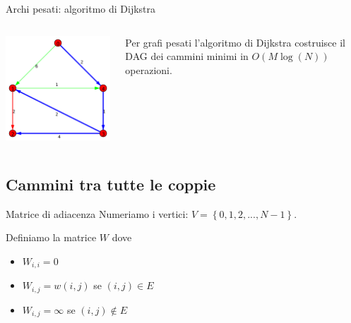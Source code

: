 \documentclass{beamer}
\theoremstyle{plain}
\theoremstyle{definition}
\theoremstyle{remark}
\newcommand{\set}[1]{\left\{#1\right\}}
\newcommand{\pa}[1]{\left(#1\right)}
\begin{document}
\begin{frame}{Archi pesati: algoritmo di Dijkstra}
    \begin{columns}
    \begin{column}{0.40\textwidth}
      \includegraphics[width=\textwidth]{dijkstraslide} 
    \end{column}
    \begin{column}{0.58\textwidth}
      Per grafi pesati l'algoritmo di Dijkstra costruisce il DAG dei
      cammini minimi in $O\pa{M\log \pa{N}}$ operazioni.
    \end{column}
  \end{columns}  
\end{frame}

\subsection{Cammini tra tutte le coppie}

\begin{frame}{Matrice di adiacenza}
  Numeriamo i vertici: $V = \set{ 0,1,2,..., N-1}$.
  
  \vfill
  Definiamo la matrice $W$ dove
  \begin{itemize}
  \item $W_{i,i} = 0$
  \item $W_{i,j} = w(i,j)$ se $(i,j) \in E$
  \item $W_{i,j} = \infty$ se $(i,j) \not\in E$
  \end{itemize}
 
\end{frame}
\end{document}
